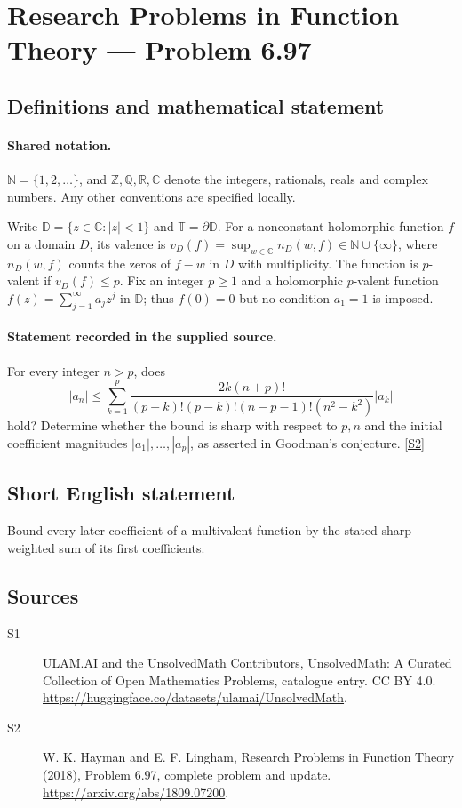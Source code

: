 \documentclass[11pt]{article}
\newcommand{\sref}[2]{\hyperlink{source:#1:#2}{[S#2]}}
\begin{document}
\section{Research Problems in Function Theory — Problem 6.97}\label{statement}

\subsection{Definitions and mathematical statement}

\paragraph{Shared notation.}$\mathbb N=\{1,2,\ldots\}$, and $\mathbb Z,\mathbb Q,\mathbb R,\mathbb C$ denote the integers, rationals, reals and complex numbers. Any other conventions are specified locally.


Write $\mathbb D=\{z\in\mathbb C:|z|<1\}$ and $\mathbb T=\partial\mathbb D$. For a nonconstant holomorphic function $f$ on a domain $D$, its valence is $v_D(f)=\sup_{w\in\mathbb C}n_D(w,f)\in\mathbb N\cup\{\infty\}$, where $n_D(w,f)$ counts the zeros of $f-w$ in $D$ with multiplicity. The function is $p$-valent if $v_D(f)\leq p$. Fix an integer $p\geq1$ and a holomorphic $p$-valent function $f(z)=\sum_{j=1}^{\infty}a_jz^j$ in $\mathbb D$; thus $f(0)=0$ but no condition $a_1=1$ is imposed.
\paragraph{Statement recorded in the supplied source.}
For every integer $n>p$, does
\[|a_n|\leq\sum_{k=1}^{p}\frac{2k(n+p)!}{(p+k)!(p-k)!(n-p-1)!(n^2-k^2)}|a_k|\]
hold? Determine whether the bound is sharp with respect to $p,n$ and the initial coefficient magnitudes $|a_1|,\ldots,|a_p|$, as asserted in Goodman's conjecture. \sref{statement}{2}
\subsection{Short English statement}
Bound every later coefficient of a multivalent function by the stated sharp weighted sum of its first coefficients.
\subsection{Sources}
\begin{description}
\item[\hypertarget{source:statement:1}{S1}] ULAM.AI and the UnsolvedMath Contributors, UnsolvedMath: A Curated Collection of Open Mathematics Problems, catalogue entry. CC BY 4.0. \url{https://huggingface.co/datasets/ulamai/UnsolvedMath}.
\item[\hypertarget{source:statement:2}{S2}] W. K. Hayman and E. F. Lingham, Research Problems in Function Theory (2018), Problem 6.97, complete problem and update. \url{https://arxiv.org/abs/1809.07200}.
\end{description}
\label{end:statement}
\end{document}
